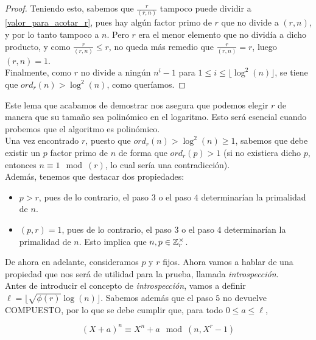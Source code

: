 \begin{proof}
	Teniendo esto, sabemos que $\frac{r}{(r, n)}$ tampoco puede dividir a \eqref{valor_para_acotar_r}, pues hay algún factor primo de $r$ que no divide a $(r, n)$, y por lo tanto tampoco a $n$. Pero $r$ era el menor elemento que no dividía a dicho producto, y como $\frac{r}{(r, n)} \leq r$, no queda más remedio que $\frac{r}{(r, n)} = r$, luego $(r, n) = 1$.\\
	
	Finalmente, como $r$ no divide a ningún $n^i - 1$ para $1 \leq i \leq \lfloor \log^2(n) \rfloor$, se tiene que $ord_r(n) > \log^2(n)$, como queríamos.
\end{proof}

Este lema que acabamos de demostrar nos asegura que podemos elegir $r$ de manera que su tamaño sea polinómico en el logaritmo. Esto será esencial cuando probemos que el algoritmo es polinómico.\\

Una vez encontrado $r$, puesto que $ord_r(n) > \log^2(n) \geq 1$, sabemos que debe existir un $p$ factor primo de $n$ de forma que $ord_r(p) > 1$ (si no existiera dicho $p$, entonces $n \equiv 1 \mod(r)$, lo cual sería una contradicción).\\

Además, tenemos que destacar dos propiedades:

\begin{itemize}
	\item $p > r$, pues de lo contrario, el paso $3$ o el paso $4$ determinarían la primalidad de $n$.
	
	\item $(p, r) = 1$, pues de lo contrario, el paso $3$ o el paso $4$ determinarían la primalidad de $n$. Esto implica que $n, p \in \mathbb{Z}_r^\times$.
\end{itemize}

De ahora en adelante, consideramos $p$ y $r$ fijos. Ahora vamos a hablar de una propiedad que nos será de utilidad para la prueba, llamada \textit{introspección}.\\

Antes de introducir el concepto de \textit{introspección}, vamos a definir $\ell = \lfloor \sqrt{\phi(r)}\log(n) \rfloor$. Sabemos además que el paso $5$ no devuelve COMPUESTO, por lo que se debe cumplir que, para todo $0 \leq a \leq \ell$,

\begin{equation}\label{identidad_con_polinomio_introspeccion}
(X + a)^n \equiv X^n + a \mod(n, X^r - 1)
\end{equation}

